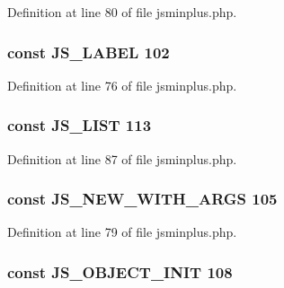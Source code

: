 Definition at line 80 of file jsminplus.\+php.

\hypertarget{jsminplus_8php_a4f1467fac3cbd4e3d39705b6fbfd8411}{
\subsubsection[{J\+S\+\_\+\+L\+A\+B\+E\+L}]{\setlength{\rightskip}{0pt plus 5cm}const J\+S\+\_\+\+L\+A\+B\+E\+L 102}}\label{jsminplus_8php_a4f1467fac3cbd4e3d39705b6fbfd8411}


Definition at line 76 of file jsminplus.\+php.

\hypertarget{jsminplus_8php_a9a02cc4ea8016c6ab09fd42512d6b43c}{
\subsubsection[{J\+S\+\_\+\+L\+I\+S\+T}]{\setlength{\rightskip}{0pt plus 5cm}const J\+S\+\_\+\+L\+I\+S\+T 113}}\label{jsminplus_8php_a9a02cc4ea8016c6ab09fd42512d6b43c}


Definition at line 87 of file jsminplus.\+php.

\hypertarget{jsminplus_8php_a85c6c091f450c52ca04f4e3a0bfc4e5c}{
\subsubsection[{J\+S\+\_\+\+N\+E\+W\+\_\+\+W\+I\+T\+H\+\_\+\+A\+R\+G\+S}]{\setlength{\rightskip}{0pt plus 5cm}const J\+S\+\_\+\+N\+E\+W\+\_\+\+W\+I\+T\+H\+\_\+\+A\+R\+G\+S 105}}\label{jsminplus_8php_a85c6c091f450c52ca04f4e3a0bfc4e5c}


Definition at line 79 of file jsminplus.\+php.

\hypertarget{jsminplus_8php_a9da96c8d85273bec327c30db9c9f4c30}{
\subsubsection[{J\+S\+\_\+\+O\+B\+J\+E\+C\+T\+\_\+\+I\+N\+I\+T}]{\setlength{\rightskip}{0pt plus 5cm}const J\+S\+\_\+\+O\+B\+J\+E\+C\+T\+\_\+\+I\+N\+I\+T 108}}\label{jsminplus_8php_a9da96c8d85273bec327c30db9c9f4c30}


